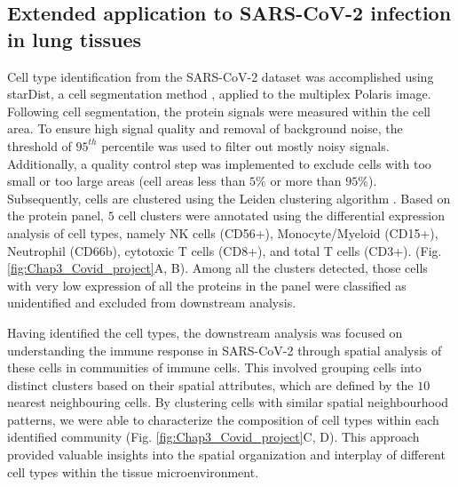 \subsection{Extended application to SARS-CoV-2 infection in lung tissues}
Cell type identification from the SARS-CoV-2 dataset was accomplished using starDist, a cell segmentation method \cite{schmidt2018cell}, applied to the multiplex Polaris image. Following cell segmentation, the protein signals were measured within the cell area. To ensure high signal quality and removal of background noise, the threshold of $95^{th}$ percentile was used to filter out mostly noisy signals. Additionally, a quality control step was implemented to exclude cells with too small or too large areas (cell areas less than $5\%$ or more than $95\%$). Subsequently, cells are clustered using the Leiden clustering algorithm \cite{wolf2018scanpy}. Based on the protein panel, $5$ cell clusters were annotated using the differential expression analysis of cell types, namely NK cells (CD56+), Monocyte/Myeloid (CD15+), Neutrophil (CD66b), cytotoxic T cells (CD8+), and total T cells (CD3+). (Fig. \ref{fig:Chap3_Covid_project}A, B). Among all the clusters detected, those cells with very low expression of all the proteins in the panel were classified as unidentified and excluded from downstream analysis.

Having identified the cell types, the downstream analysis was focused on understanding the immune response in SARS-CoV-2 through spatial analysis of these cells in communities of immune cells. This involved grouping cells into distinct clusters based on their spatial attributes, which are defined by the $10$ nearest neighbouring cells. By clustering cells with similar spatial neighbourhood patterns, we were able to characterize the composition of cell types within each identified community (Fig. \ref{fig:Chap3_Covid_project}C, D). This approach provided valuable insights into the spatial organization and interplay of different cell types within the tissue microenvironment.

